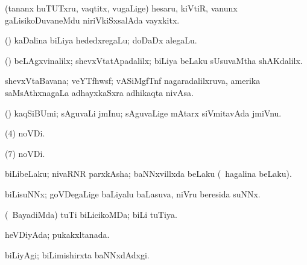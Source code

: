 {{{{{{\bentry
{}
 \gl{\nA}\bmng
(tananx huTUTxru, vaqtitx, \mo vugaLige) hesaru, kiVtiR, \mo vanunx gaLisikoDuvaneMdu niriVkiSxsalAda vayxkitx. 
\emng
\eentry

\bentry
{}
 \gl{\nA}\bmng
(\rUpa) kaDalina biLiya hededxregaLu; doDaDx alegaLu. 
\emng
\eentry

\bentry
{}
 \gl{\kirxvi}\bmng
(\loVvi) beLAgxvinalilx; shevxVtatApadalilx; biLiya beLaku sUsuvaMtha shAKdalilx. 
\emng
\eentry

\bentry
{}
 \gl{\nA}\bmng
shevxVtaBavana; veYTfhwsf; vASiMgfTnf nagaradalilxruva, amerika saMsAthxnagaLa adhayxkaSxra adhikaqta nivAsa. 
\emng
\eentry

\bentry
{}
 \gl{\nA}\bmng
(\birx) kaqSiBUmi; sAguvaLi jmInu; sAguvaLige mAtarx siVmitavAda jmiVnu. 
\emng
\eentry

\bentry
{}
 \gl{\nA}\bmng
{} (\pagu $4$) noVDi. 
\emng
\eentry

\bentry
{}
 \gl{\nA}\bmng
{} 
\emng
\eentry

\bentry
{}
 \gl{\nA}\bmng
{} 
\emng
\eentry

\bentry
{}
 \gl{\nA}\bmng
{} (\pagu $7$) noVDi. 
\emng
\eentry

\bentry
{}
 \gl{\nA}\bmng
biLibeLaku; nivaRNR parxkAsha; baNNxvillxda beLaku (\udA\ hagalina beLaku). 
\emng
\eentry

\bentry
{}
 \gl{\nA}\bmng
biLisuNNx; goVDegaLige baLiyalu baLasuva, niVru beresida suNNx. 
\emng
\eentry

\bentry
{}
  \gl{\gu}\bmng
(\kanmu\ BayadiMda) tuTi biLicikoMDa; biLi tuTiya. 
\emng
\eentry

\bentry
{}
  \gl{\nA}\bmng
heVDiyAda; pukakxltanada. 
\emng
\eentry

\bentry
{}
  \gl{\kirxvi}\bmng
biLiyAgi; biLimishirxta baNNxdAdxgi. 
\emng
\eentry

}}}}}}
